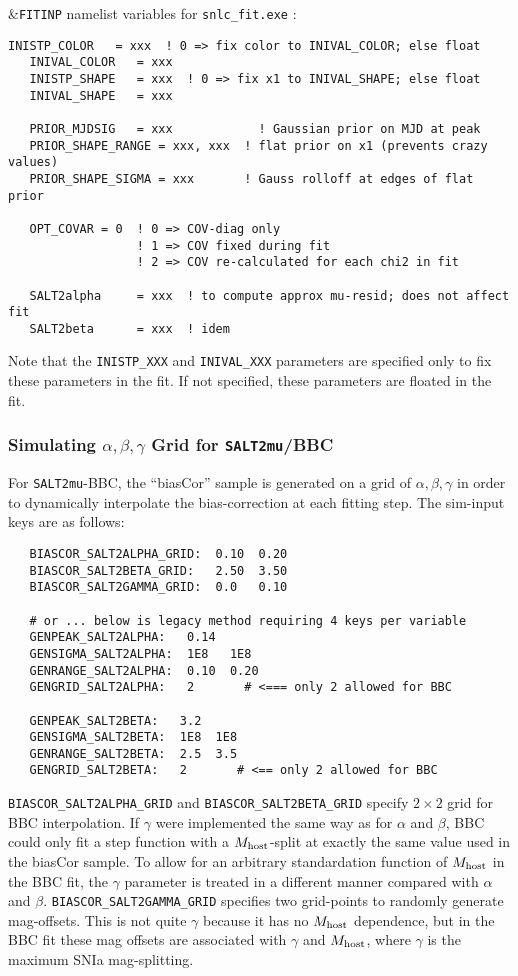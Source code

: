 \documentclass[12pt]{article}
\newcommand{\hostmass}{M_{\rm host}}
\begin{document}
\clearpage
\noindent
\&{\tt FITINP} namelist variables  for {\tt snlc\_fit.exe} :
\begin{Verbatim}[frame=single]
   INISTP_COLOR   = xxx  ! 0 => fix color to INIVAL_COLOR; else float
   INIVAL_COLOR   = xxx
   INISTP_SHAPE   = xxx  ! 0 => fix x1 to INIVAL_SHAPE; else float
   INIVAL_SHAPE   = xxx

   PRIOR_MJDSIG   = xxx            ! Gaussian prior on MJD at peak
   PRIOR_SHAPE_RANGE = xxx, xxx  ! flat prior on x1 (prevents crazy values)
   PRIOR_SHAPE_SIGMA = xxx       ! Gauss rolloff at edges of flat prior

   OPT_COVAR = 0  ! 0 => COV-diag only 
                  ! 1 => COV fixed during fit
                  ! 2 => COV re-calculated for each chi2 in fit

   SALT2alpha     = xxx  ! to compute approx mu-resid; does not affect fit
   SALT2beta      = xxx  ! idem
\end{Verbatim}
Note that the {\tt INISTP\_XXX} and {\tt INIVAL\_XXX} parameters
are specified only to fix these parameters in the fit. 
If not specified, these parameters are floated in the fit.


\subsubsection{Simulating $\alpha,\beta,\gamma$ Grid for {\tt SALT2mu}/BBC }
\label{sss:simgrid_forSALT2mu}
For {\tt SALT2mu}-BBC, the ``biasCor'' sample is generated on
a grid of $\alpha,\beta,\gamma$ in order to dynamically interpolate
the bias-correction at each fitting step. The sim-input
keys are as follows:
%
\begin{verbatim}
   BIASCOR_SALT2ALPHA_GRID:  0.10  0.20 
   BIASCOR_SALT2BETA_GRID:   2.50  3.50
   BIASCOR_SALT2GAMMA_GRID:  0.0   0.10

   # or ... below is legacy method requiring 4 keys per variable
   GENPEAK_SALT2ALPHA:   0.14   
   GENSIGMA_SALT2ALPHA:  1E8   1E8
   GENRANGE_SALT2ALPHA:  0.10  0.20
   GENGRID_SALT2ALPHA:   2       # <=== only 2 allowed for BBC

   GENPEAK_SALT2BETA:   3.2 
   GENSIGMA_SALT2BETA:  1E8  1E8 
   GENRANGE_SALT2BETA:  2.5  3.5
   GENGRID_SALT2BETA:   2       # <== only 2 allowed for BBC
\end{verbatim}
%
{\tt BIASCOR\_SALT2ALPHA\_GRID} and {\tt BIASCOR\_SALT2BETA\_GRID}
specify $2\times 2$ grid for BBC interpolation.
%
If $\gamma$ were implemented the same way as for $\alpha$ and $\beta$, 
BBC could only fit a step function with a $\hostmass$-split 
at exactly the same value used in the biasCor sample.
To allow for an arbitrary standardation function of $\hostmass$ 
in the BBC fit,
the $\gamma$ parameter is treated in a different manner compared
with $\alpha$ and $\beta$. {\tt BIASCOR\_SALT2GAMMA\_GRID} specifies
two grid-points to randomly generate mag-offsets. This is not
quite $\gamma$ because it has no $\hostmass$ dependence, but in the
BBC fit these mag offsets are associated with $\gamma$ and $\hostmass$,
where $\gamma$ is the maximum SNIa mag-splitting.
\end{document}
